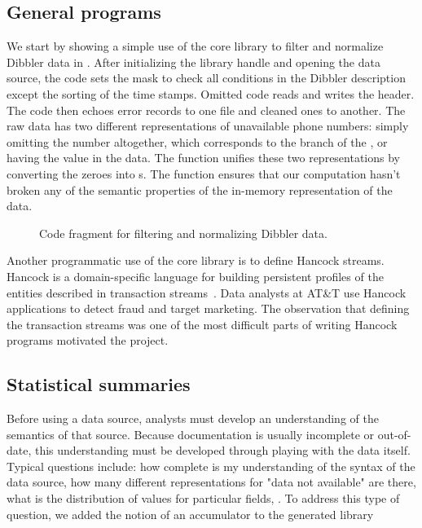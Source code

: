 \documentclass{sig-alternate}
\begin{document}
\subsection{General programs}
We start by showing a simple use of 
the core library to filter and normalize Dibbler data
in . After initializing
the \pads{} library handle and opening the data source, the code sets
the mask to check all conditions in the Dibbler description except the
sorting of the time stamps.  Omitted code reads and writes the header. 
The code then echoes error records to one file and cleaned ones to another.
The raw data has two different representations of unavailable phone numbers:
simply omitting the number altogether, which corresponds to the 
branch of the , or having the value  in the data.  
The function  unifies these two representations 
by converting the zeroes into s.  The function 
ensures that our computation hasn't broken any of the semantic properties
of the in-memory representation of the data.
\begin{figure*}
\begin{small}
\begin{center}

\label{figure:dibbler-filter}
\caption{Code fragment for filtering and normalizing Dibbler data.}
\end{center}
\end{small}
\end{figure*}

Another programmatic use of the core library is to define  
Hancock streams.  Hancock is a domain-specific language for
building persistent profiles of the entities described in transaction 
streams~\cite{hancock-toplas}.  Data analysts at AT\&T use Hancock 
applications to detect fraud and target marketing. 
The observation that defining the transaction
streams was one of the most difficult parts of writing Hancock programs
motivated the \pads{} project. 


\subsection{Statistical summaries}
Before using a data source, analysts must develop an understanding 
of the semantics of that source.  Because documentation is usually
incomplete or out-of-date, this understanding must be developed 
through playing with the data itself.  Typical questions include:
how complete is my understanding of the syntax of the data source,
how many different representations for "data not available" are there,
what is the distribution of values for particular fields, \etc{}.
To address this type of question, we added the notion of an accumulator
to the generated library
\end{document}
